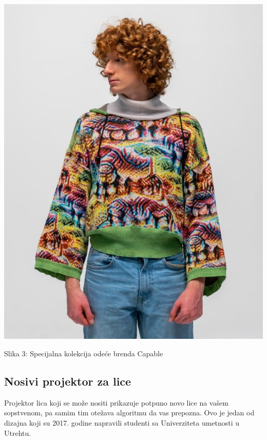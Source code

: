 \documentclass{article}
\begin{document}
\begin{center}
\begin{minipage}{0.5\textwidth}
\includegraphics[width=\textwidth]{odeca2.jpg}
\end{minipage}

\vspace{0.5cm}

Slika 3: Specijalna kolekcija odeće brenda Capable
\end{center}

\subsection{Nosivi projektor za lice}
Projektor lica koji se može nositi prikazuje potpuno novo lice na vašem sopstvenom, pa samim tim otežava algoritmu da vas prepozna. Ovo je jedan od dizajna koji su 2017. godine napravili studenti sa Univerziteta umetnosti u Utrehtu. \cite{druga}
\end{document}
